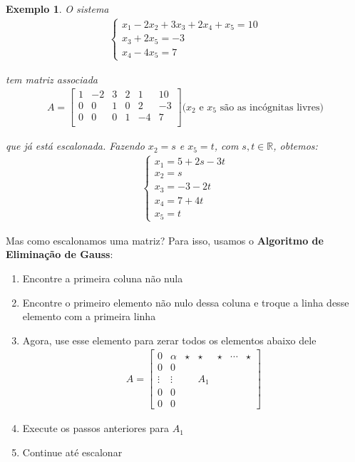 \documentclass{article}
\newtheorem*{example}{Exemplo}
\begin{document}
\begin{example}
	O sistema
	\begin{align*}
	\begin{cases}
	x_1 - 2x_2 + 3x_3 + 2x_4 + x_5 = 10 \\
	x_3 + 2x_5 = -3 \\
	x_4 - 4x_5 = 7
	\end{cases}
	\end{align*}
	\par\vspace{0.3cm} tem matriz associada
	\begin{align*}
	A = \begin{bmatrix}
	1 & -2 & 3 & 2 & 1 & 10 \\
	0 & 0 & 1 & 0 & 2 & -3 \\
	0 & 0 & 0 & 1 & -4 & 7 \\
	\end{bmatrix} \text{($x_2$ e $x_5$ são as incógnitas livres)}
	\end{align*}
	\par\vspace{0.3cm} que já está escalonada. Fazendo $x_2 = s$ e $x_5 = t$, com $s,t\in\mathbb{R}$, obtemos:
	\begin{align*}
	\begin{cases}
	x_1 = 5 + 2s - 3t \\
	x_2 = s \\
	x_3 = -3 - 2t \\
	x_4 = 7 + 4t \\
	x_5 = t
	\end{cases}
	\end{align*}
\end{example}
\par\vspace{0.3cm} Mas como escalonamos uma matriz? Para isso, usamos o \textbf{Algoritmo de Eliminação de Gauss}:
\begin{enumerate}
	\item Encontre a primeira coluna não nula 
	\item Encontre o primeiro elemento não nulo dessa coluna e troque a linha desse elemento com a primeira linha
	\item Agora, use esse elemento para zerar todos os elementos abaixo dele
	\begin{align*}
	A = \begin{bmatrix}
	0 & \alpha & \star & \star & \star &\cdots & \star \\
	0 & 0 & & & & & \\
	\vdots & \vdots &  & A_1 & & &\\
	0 & 0 & & & & & \\
	0 & 0 & & & & &
	\end{bmatrix}
	\end{align*}
	\item Execute os passos anteriores para $A_1$
	\item Continue até escalonar
\end{enumerate}
\end{document}
